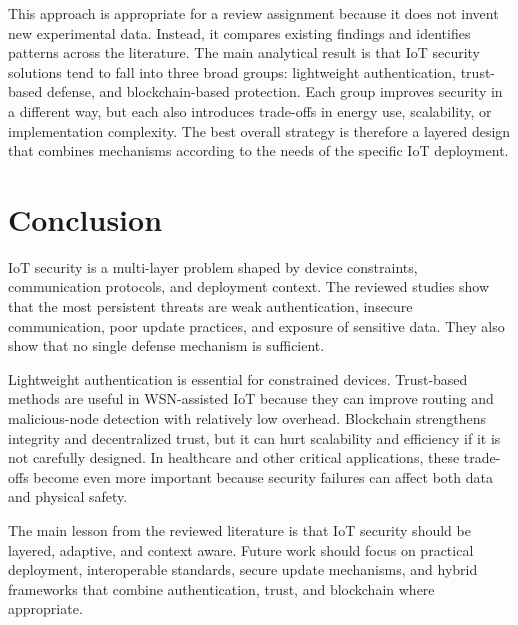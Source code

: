 \documentclass[conference]{IEEEtran}
\begin{document}
This approach is appropriate for a review assignment because it does not invent new experimental data. Instead, it compares existing findings and identifies patterns across the literature. The main analytical result is that IoT security solutions tend to fall into three broad groups: lightweight authentication, trust-based defense, and blockchain-based protection. Each group improves security in a different way, but each also introduces trade-offs in energy use, scalability, or implementation complexity. The best overall strategy is therefore a layered design that combines mechanisms according to the needs of the specific IoT deployment.

\section{Conclusion}
IoT security is a multi-layer problem shaped by device constraints, communication protocols, and deployment context. The reviewed studies show that the most persistent threats are weak authentication, insecure communication, poor update practices, and exposure of sensitive data. They also show that no single defense mechanism is sufficient.

Lightweight authentication is essential for constrained devices. Trust-based methods are useful in WSN-assisted IoT because they can improve routing and malicious-node detection with relatively low overhead. Blockchain strengthens integrity and decentralized trust, but it can hurt scalability and efficiency if it is not carefully designed. In healthcare and other critical applications, these trade-offs become even more important because security failures can affect both data and physical safety.

The main lesson from the reviewed literature is that IoT security should be layered, adaptive, and context aware. Future work should focus on practical deployment, interoperable standards, secure update mechanisms, and hybrid frameworks that combine authentication, trust, and blockchain where appropriate.
\end{document}
